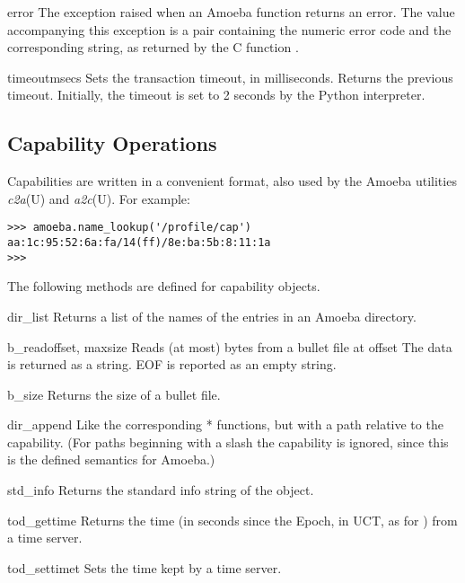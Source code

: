 \begin{excdesc}{error}
The exception raised when an Amoeba function returns an error.
The value accompanying this exception is a pair containing the numeric
error code and the corresponding string, as returned by the C function
.
\end{excdesc}

\begin{funcdesc}{timeout}{msecs}
Sets the transaction timeout, in milliseconds.
Returns the previous timeout.
Initially, the timeout is set to 2 seconds by the Python interpreter.
\end{funcdesc}

\subsection{Capability Operations}

Capabilities are written in a convenient \ASCII{} format, also used by the
Amoeba utilities
\emph{c2a}(U)
and
\emph{a2c}(U).
For example:

\begin{verbatim}
>>> amoeba.name_lookup('/profile/cap')
aa:1c:95:52:6a:fa/14(ff)/8e:ba:5b:8:11:1a
>>> 
\end{verbatim}
%
The following methods are defined for capability objects.

\begin{funcdesc}{dir_list}{}
Returns a list of the names of the entries in an Amoeba directory.
\end{funcdesc}

\begin{funcdesc}{b_read}{offset, maxsize}
Reads (at most)
bytes from a bullet file at offset
The data is returned as a string.
EOF is reported as an empty string.
\end{funcdesc}

\begin{funcdesc}{b_size}{}
Returns the size of a bullet file.
\end{funcdesc}

\begin{funcdesc}{dir_append}{}
Like the corresponding
*
functions, but with a path relative to the capability.
(For paths beginning with a slash the capability is ignored, since this
is the defined semantics for Amoeba.)
\end{funcdesc}

\begin{funcdesc}{std_info}{}
Returns the standard info string of the object.
\end{funcdesc}

\begin{funcdesc}{tod_gettime}{}
Returns the time (in seconds since the Epoch, in UCT, as for \POSIX) from
a time server.
\end{funcdesc}

\begin{funcdesc}{tod_settime}{t}
Sets the time kept by a time server.
\end{funcdesc}
